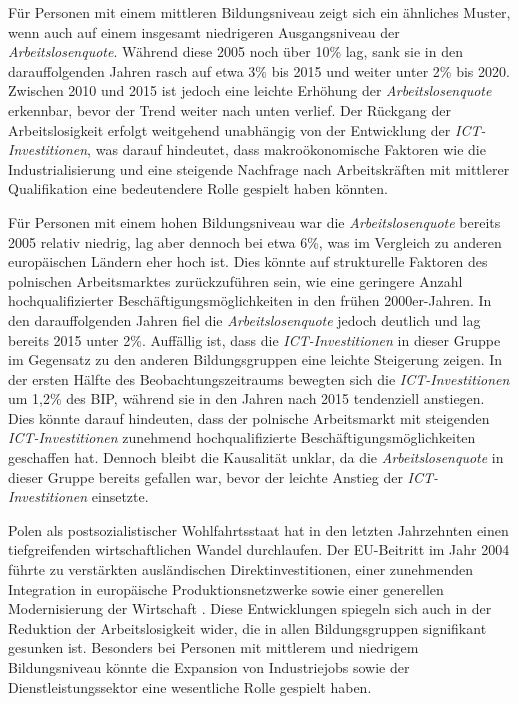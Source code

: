 Für Personen mit einem mittleren Bildungsniveau zeigt sich ein ähnliches Muster, wenn auch auf 
einem insgesamt niedrigeren Ausgangsniveau der \textit{Arbeitslosenquote}. Während diese 2005 
noch über 10\% lag, sank sie in den darauffolgenden Jahren rasch auf etwa 3\% bis 2015 und weiter 
unter 2\% bis 2020. Zwischen 2010 und 2015 ist jedoch eine leichte Erhöhung der 
\textit{Arbeitslosenquote} erkennbar, bevor der Trend weiter nach unten verlief. Der Rückgang der 
Arbeitslosigkeit erfolgt weitgehend unabhängig von der Entwicklung der 
\textit{\ac{ICT}-Investitionen}, was darauf hindeutet, dass makroökonomische Faktoren wie die 
Industrialisierung und eine steigende Nachfrage nach Arbeitskräften mit mittlerer Qualifikation 
eine bedeutendere Rolle gespielt haben könnten.

Für Personen mit einem hohen Bildungsniveau war die \textit{Arbeitslosenquote} bereits 2005 
relativ niedrig, lag aber dennoch bei etwa 6\%, was im Vergleich zu anderen europäischen Ländern 
eher hoch ist. Dies könnte auf strukturelle Faktoren des polnischen Arbeitsmarktes zurückzuführen 
sein, wie eine geringere Anzahl hochqualifizierter Beschäftigungsmöglichkeiten in den frühen 
2000er-Jahren. In den darauffolgenden Jahren fiel die \textit{Arbeitslosenquote} jedoch deutlich 
und lag bereits 2015 unter 2\%. Auffällig ist, dass die \textit{\ac{ICT}-Investitionen} in dieser 
Gruppe im Gegensatz zu den anderen Bildungsgruppen eine leichte Steigerung zeigen. In der ersten 
Hälfte des Beobachtungszeitraums bewegten sich die \textit{\ac{ICT}-Investitionen} um 1,2\% des 
BIP, während sie in den Jahren nach 2015 tendenziell anstiegen. Dies könnte darauf hindeuten, 
dass der polnische Arbeitsmarkt mit steigenden \textit{\ac{ICT}-Investitionen} zunehmend 
hochqualifizierte Beschäftigungsmöglichkeiten geschaffen hat. Dennoch bleibt die Kausalität 
unklar, da die \textit{Arbeitslosenquote} in dieser Gruppe bereits gefallen war, bevor der 
leichte Anstieg der \textit{\ac{ICT}-Investitionen} einsetzte.

Polen als postsozialistischer Wohlfahrtsstaat hat in den letzten Jahrzehnten einen tiefgreifenden 
wirtschaftlichen Wandel durchlaufen. Der EU-Beitritt im Jahr 2004 führte zu verstärkten 
ausländischen Direktinvestitionen, einer zunehmenden Integration in europäische 
Produktionsnetzwerke sowie einer generellen Modernisierung der Wirtschaft 
\parencite[vgl.][S. 186–189]{myant2013transition}. Diese Entwicklungen spiegeln sich auch in der 
Reduktion der Arbeitslosigkeit wider, die in allen Bildungsgruppen signifikant gesunken ist. 
Besonders bei Personen mit mittlerem und niedrigem Bildungsniveau könnte die Expansion von 
Industriejobs sowie der Dienstleistungssektor eine wesentliche Rolle gespielt haben.

